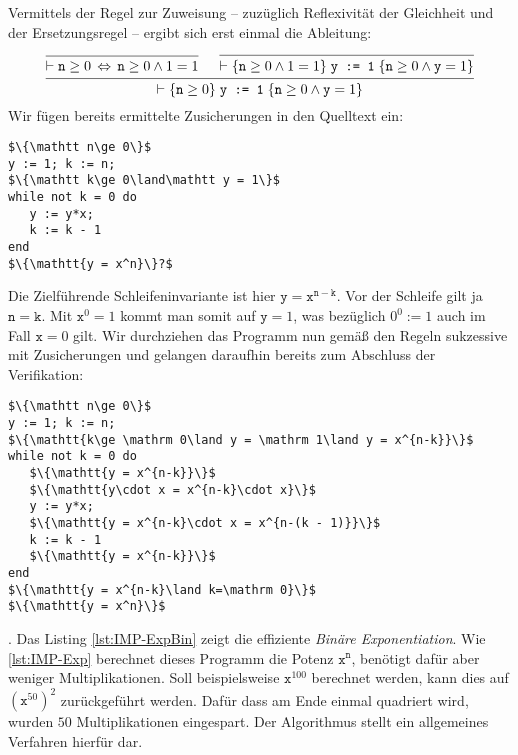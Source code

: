 Vermittels der Regel zur Zuweisung -- zuzüglich Reflexivität der
Gleichheit und der Ersetzungsregel -- ergibt sich erst einmal die Ableitung:
\[\begin{prooftree}
  \infer0{\vdash \mathtt n\ge 0\,\Leftrightarrow\,\mathtt n\ge 0\land 1 = 1}
  \infer0{\vdash\{\mathtt n\ge 0\land 1 = 1\}\;\code{y := 1}\;\{\mathtt n\ge 0\land\mathtt y = 1\}}
\infer2{\vdash\{\mathtt n\ge 0\}\;\code{y := 1}\;\{\mathtt n\ge 0\land\mathtt y = 1\}}
\end{prooftree}\]
Wir fügen bereits ermittelte Zusicherungen in den Quelltext ein:
\begin{lstlisting}[language=IMP, xleftmargin=\mathindent, mathescape]
$\{\mathtt n\ge 0\}$
y := 1; k := n;
$\{\mathtt k\ge 0\land\mathtt y = 1\}$
while not k = 0 do
   y := y*x;
   k := k - 1
end
$\{\mathtt{y = x^n}\}?$
\end{lstlisting}

\noindent
Die Zielführende Schleifeninvariante ist hier $\mathtt{y =
x^{n-k}}$. Vor der Schleife gilt ja $\mathtt{n=k}$.
Mit $\mathtt{x}^0 = 1$ kommt man somit auf $\mathtt y = 1$, was
bezüglich $0^0:=1$ auch im Fall $\mathtt x = 0$ gilt.
Wir durchziehen das Programm nun gemäß den Regeln sukzessive mit
Zusicherungen und gelangen daraufhin bereits zum Abschluss der Verifikation:
\begin{lstlisting}[language=IMP, xleftmargin=\mathindent, mathescape]
$\{\mathtt n\ge 0\}$
y := 1; k := n;
$\{\mathtt{k\ge \mathrm 0\land y = \mathrm 1\land y = x^{n-k}}\}$
while not k = 0 do
   $\{\mathtt{y = x^{n-k}}\}$
   $\{\mathtt{y\cdot x = x^{n-k}\cdot x}\}$
   y := y*x;
   $\{\mathtt{y = x^{n-k}\cdot x = x^{n-(k - 1)}}\}$
   k := k - 1
   $\{\mathtt{y = x^{n-k}}\}$
end
$\{\mathtt{y = x^{n-k}\land k=\mathrm 0}\}$
$\{\mathtt{y = x^n}\}$
\end{lstlisting}

\noindent{}.
Das Listing \ref{lst:IMP-ExpBin} zeigt die effiziente \emph{Binäre
Exponentiation}. Wie \ref{lst:IMP-Exp} berechnet dieses Programm die
Potenz $\mathtt{x^n}$, benötigt dafür aber weniger Multiplikationen. Soll
beispielsweise $\mathtt x^{100}$ berechnet werden, kann dies auf
$(\mathtt x^{50})^2$ zurückgeführt werden. Dafür dass am Ende einmal
quadriert wird, wurden $50$ Multiplikationen eingespart. Der Algorithmus
stellt ein allgemeines Verfahren hierfür dar.

